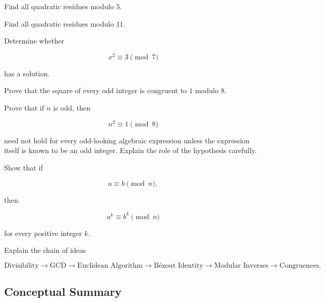\begin{exercise}[2]
Find all quadratic residues modulo \(5\).
\end{exercise}

\begin{exercise}[2]
Find all quadratic residues modulo \(11\).
\end{exercise}

\begin{exercise}[3]
Determine whether

\[ x^2\equiv3\pmod7 \]

has a solution.
\end{exercise}

\begin{exercise}[3]
Prove that the square of every odd integer is congruent to \(1\) modulo \(8\).
\end{exercise}

\begin{exercise}[3]
Prove that if \(n\) is odd, then

\[ n^2\equiv1\pmod8 \]

need not hold for every odd-looking algebraic expression unless the
expression itself is known to be an odd integer. Explain the role of the
hypothesis carefully.
\end{exercise}

\begin{exercise}[3]
Show that if

\[ a\equiv b\pmod n, \]

then

\[ a^k\equiv b^k\pmod n \]

for every positive integer \(k\).
\end{exercise}

\begin{exercise}[3]
Explain the chain of ideas

\[
\text{Divisibility}
\longrightarrow
\text{GCD}
\longrightarrow
\text{Euclidean Algorithm}
\longrightarrow
\text{Bézout Identity}
\longrightarrow
\text{Modular Inverses}
\longrightarrow
\text{Congruences}.
\]
\end{exercise}

\subsection{Conceptual Summary}
\label{subsec:elementary-number-theory-summary}

